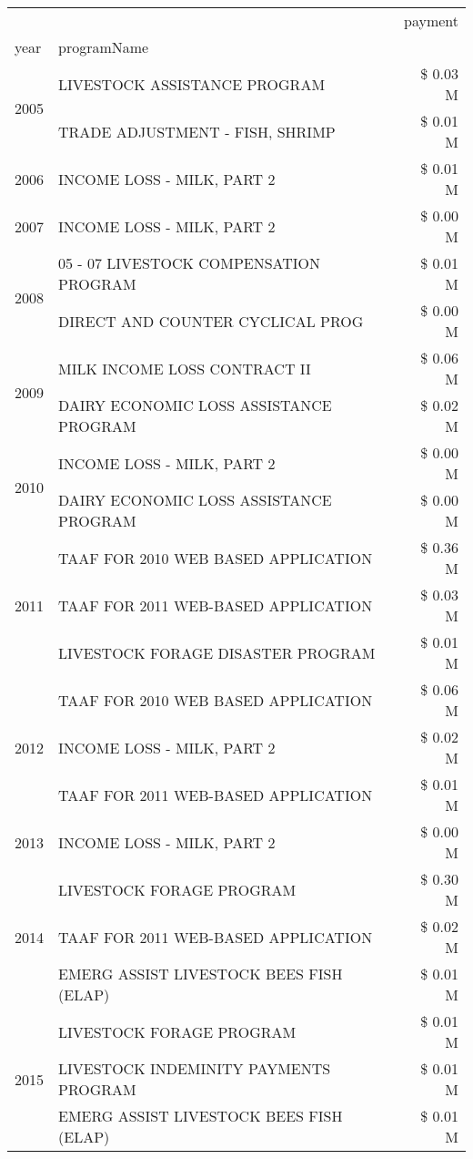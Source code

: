 \begin{tabular}{llr}
\toprule
 &  & payment \\
year & programName &  \\
\midrule
\multirow[t]{2}{*}{2005} & LIVESTOCK ASSISTANCE PROGRAM & \$ 0.03 M \\
 & TRADE ADJUSTMENT - FISH, SHRIMP & \$ 0.01 M \\
\cline{1-3}
2006 & INCOME LOSS - MILK, PART 2 & \$ 0.01 M \\
\cline{1-3}
2007 & INCOME LOSS - MILK, PART 2 & \$ 0.00 M \\
\cline{1-3}
\multirow[t]{2}{*}{2008} & 05 - 07 LIVESTOCK COMPENSATION PROGRAM & \$ 0.01 M \\
 & DIRECT AND COUNTER CYCLICAL PROG & \$ 0.00 M \\
\cline{1-3}
\multirow[t]{2}{*}{2009} & MILK INCOME LOSS CONTRACT II & \$ 0.06 M \\
 & DAIRY ECONOMIC LOSS ASSISTANCE PROGRAM & \$ 0.02 M \\
\cline{1-3}
\multirow[t]{2}{*}{2010} & INCOME LOSS - MILK, PART 2 & \$ 0.00 M \\
 & DAIRY ECONOMIC LOSS ASSISTANCE PROGRAM & \$ 0.00 M \\
\cline{1-3}
\multirow[t]{3}{*}{2011} & TAAF FOR 2010 WEB BASED APPLICATION & \$ 0.36 M \\
 & TAAF FOR 2011 WEB-BASED APPLICATION & \$ 0.03 M \\
 & LIVESTOCK FORAGE DISASTER PROGRAM & \$ 0.01 M \\
\cline{1-3}
\multirow[t]{3}{*}{2012} & TAAF FOR 2010 WEB BASED APPLICATION & \$ 0.06 M \\
 & INCOME LOSS - MILK, PART 2 & \$ 0.02 M \\
 & TAAF FOR 2011 WEB-BASED APPLICATION & \$ 0.01 M \\
\cline{1-3}
2013 & INCOME LOSS - MILK, PART 2 & \$ 0.00 M \\
\cline{1-3}
\multirow[t]{3}{*}{2014} & LIVESTOCK FORAGE PROGRAM & \$ 0.30 M \\
 & TAAF FOR 2011 WEB-BASED APPLICATION & \$ 0.02 M \\
 & EMERG ASSIST LIVESTOCK BEES FISH (ELAP) & \$ 0.01 M \\
\cline{1-3}
\multirow[t]{3}{*}{2015} & LIVESTOCK FORAGE PROGRAM & \$ 0.01 M \\
 & LIVESTOCK INDEMINITY PAYMENTS PROGRAM & \$ 0.01 M \\
 & EMERG ASSIST LIVESTOCK BEES FISH (ELAP) & \$ 0.01 M \\

\end{tabular}
